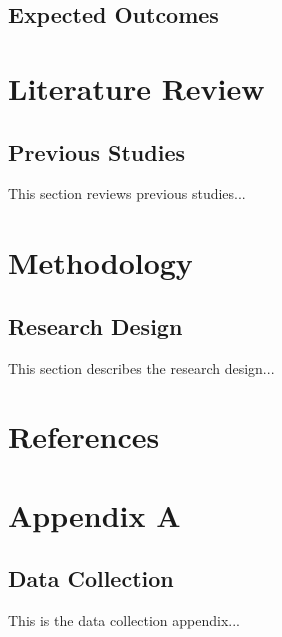 \documentclass[a4paper, 12pt]{report}
\begin{document}
\section{Expected Outcomes}

\chapter{Literature Review}
\section{Previous Studies}
This section reviews previous studies...

\chapter{Methodology}
\section{Research Design}
This section describes the research design...


\chapter*{References}


\appendix
\chapter{Appendix A}
\section{Data Collection}
This is the data collection appendix...
\end{document}
